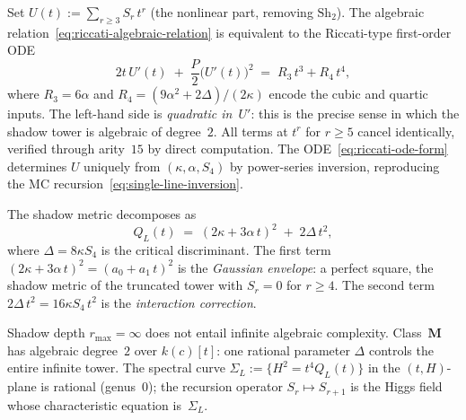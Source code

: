 \begin{remark}
\label{rem:riccati-ode}
Set $U(t) := \sum_{r \geq 3} S_r\,t^r$ (the nonlinear part, removing
$\mathrm{Sh}_2$).  The algebraic relation~\eqref{eq:riccati-algebraic-relation}
is equivalent to the Riccati-type first-order ODE
\begin{equation}\label{eq:riccati-ode-form}
  2t\,U'(t) \;+\; \frac{P}{2}\bigl(U'(t)\bigr)^2
  \;=\; R_3\,t^3 + R_4\,t^4,
\end{equation}
where $R_3 = 6\alpha$ and
$R_4 = (9\alpha^2 + 2\Delta)/(2\kappa)$ encode the cubic and quartic inputs.
The left-hand side is \emph{quadratic in~$U'$}: this is the precise sense in
which the shadow tower is algebraic of degree~$2$.  All terms at $t^r$ for
$r \geq 5$ cancel identically, verified through
arity~$15$ by direct computation.  The ODE~\eqref{eq:riccati-ode-form}
determines $U$ uniquely from $(\kappa, \alpha, S_4)$ by power-series inversion,
reproducing the MC recursion~\eqref{eq:single-line-inversion}.
\end{remark}

\begin{corollary}
\label{cor:gaussian-decomposition}
\label{rem:shadow-algebraic-degree}
The shadow metric decomposes as
\begin{equation}\label{eq:gaussian-decomposition}
  Q_L(t)
  \;=\;
  (2\kappa + 3\alpha\,t)^2
  \;+\;
  2\Delta\,t^2,
\end{equation}
where $\Delta = 8\kappa S_4$ is the critical discriminant.
The first term $(2\kappa + 3\alpha\,t)^2 = (a_0 + a_1\,t)^2$
is the \emph{Gaussian envelope}: a perfect square, the shadow
metric of the truncated tower with $S_r = 0$ for $r \geq 4$.
The second term $2\Delta\,t^2 = 16\kappa S_4\,t^2$
is the \emph{interaction correction}.

Shadow depth $r_{\max} = \infty$ does not entail infinite
algebraic complexity.
Class~$\mathbf{M}$ has algebraic degree~$2$
over $k(c)[t]$: one rational parameter $\Delta$ controls
the entire infinite tower.  The spectral curve
$\Sigma_L := \{H^2 = t^4 Q_L(t)\}$ in the
$(t,H)$-plane is rational (genus~$0$); the recursion operator
$S_r \mapsto S_{r+1}$ is the Higgs field whose
characteristic equation is~$\Sigma_L$.
\end{corollary}

